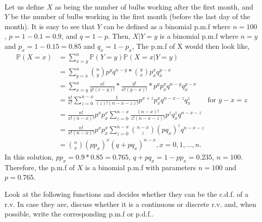 \documentclass[letterpaper,12pt,addpoints]{exam}
\begin{document}
\begin{questions}
\begin{solution}\\
Let us define $X$ as being the number of bulbs working after the first month, and $Y$ be the number of bulbs working in the first month (before the last day of the month). It is easy to see that $Y$ can be defined as a binomial p.m.f where $n=100$, $p=1-0.1=0.9$, and $q=1-p$. Then, $X|Y=y$ is a binomial p.m.f where $n=y$ and $p_x=1-0.15=0.85$ and $q_x=1-p_x$,
The p.m.f of X would then look like,
\begin{align*}
    \mathbb{P}(X=x) &= \sum_{x=y}^{n}\mathbb{P}(Y=y)\mathbb{P}(X=x|Y=y)\\
    &=\sum_{y=x}^{n}\binom{n}{y}p^yq^{n-y}*\binom{y}{x}p_x^xq_x^{y-x}\\
    &=\sum_{x=y}^{n}\frac{n!}{y!(c-y)!}*\frac{y!}{x!(y-x)!}*p^yp_x^xq^{n-y}q_x^{y-x}\\
    &=\frac{n!}{x!}\sum_{z=0}^{n-x}\frac{1}{(z)!(n-x-z)!}p^{x+z}p_x^xq^{n-x-z}q_x^z \hspace{1cm} \text{for } y-x=z\\
    &= \frac{n!}{x!(n-x)!}p^xp_x^x\sum_{z=0}^{n-x}\frac{(n-x)!}{z!(n-x-z)!}p^zq_x^zq^{n-x-z}\\
    &= \frac{n!}{x!(n-x)!}p^xp_x^x\sum_{z=0}^{n-x}\binom{n-x}{z}(pq_x)^zq^{n-x-z}\\
    &= \binom{n}{x}(pp_x)^x(q+pq_x)^{n-x}, x=0, 1, ..., n.
\end{align*}
In this solution, $pp_x = 0.9*0.85=0.765$, $q+pq_x=1-pp_x=0.235$, $n=100$. Therefore, the p.m.f of $X$ is a binomial p.m.f with parameters $n=100$ and $p=0.765$.
\end{solution}

\vspace*{\fill}
\eject

\question[10]
Look at the following functions and decides whether they can be the c.d.f. of a 
r.v. In case they are, discuss whether it is a continuous or discrete r.v. and, 
when possible, write the corresponding p.m.f or p.d.f..


\end{questions}
\end{document}
